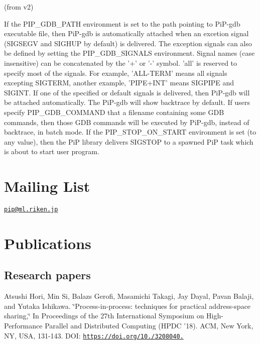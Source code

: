 (from v2)

If the P\-I\-P\-\_\-\-G\-D\-B\-\_\-\-P\-A\-T\-H environment is set to the path pointing to Pi\-P-\/gdb executable file, then Pi\-P-\/gdb is automatically attached when an excetion signal (S\-I\-G\-S\-E\-G\-V and S\-I\-G\-H\-U\-P by default) is delivered. The exception signals can also be defined by setting the P\-I\-P\-\_\-\-G\-D\-B\-\_\-\-S\-I\-G\-N\-A\-L\-S environment. Signal names (case insensitive) can be concatenated by the '+' or '-\/' symbol. 'all' is reserved to specify most of the signals. For example, 'A\-L\-L-\/\-T\-E\-R\-M' means all signals excepting S\-I\-G\-T\-E\-R\-M, another example, 'P\-I\-P\-E+\-I\-N\-T' means S\-I\-G\-P\-I\-P\-E and S\-I\-G\-I\-N\-T. If one of the specified or default signals is delivered, then Pi\-P-\/gdb will be attached automatically. The Pi\-P-\/gdb will show backtrace by default. If users specify P\-I\-P\-\_\-\-G\-D\-B\-\_\-\-C\-O\-M\-M\-A\-N\-D that a filename containing some G\-D\-B commands, then those G\-D\-B commands will be executed by Pi\-P-\/gdb, instead of backtrace, in batch mode. If the P\-I\-P\-\_\-\-S\-T\-O\-P\-\_\-\-O\-N\-\_\-\-S\-T\-A\-R\-T environment is set (to any value), then the Pi\-P library delivers S\-I\-G\-S\-T\-O\-P to a spawned Pi\-P task which is about to start user program.

\section*{Mailing List}

\href{mailto:pip@ml.riken.jp}{\tt pip@ml.\-riken.\-jp}

\section*{Publications}

\subsection*{Research papers}

Atsushi Hori, Min Si, Balazs Gerofi, Masamichi Takagi, Jay Dayal, Pavan Balaji, and Yutaka Ishikawa. \char`\"{}\-Process-\/in-\/process\-: techniques for
practical address-\/space sharing,\char`\"{} In Proceedings of the 27th International Symposium on High-\/\-Performance Parallel and Distributed Computing (H\-P\-D\-C '18). A\-C\-M, New York, N\-Y, U\-S\-A, 131-\/143. D\-O\-I\-: \href{https://doi.org/10.1145/3208040.3208045}{\tt https\-://doi.\-org/10./3208040.}

